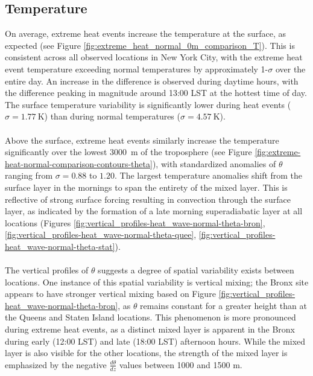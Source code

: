 \documentclass[11pt,a4paper]{article}
\begin{document}
\subsection{Temperature}
On average, extreme heat events increase the temperature at the surface, as expected (see Figure \ref{fig:extreme_heat_normal_0m_comparison_T}). This is consistent across all observed locations in New York City, with the extreme heat event temperature exceeding normal temperatures by approximately 1-$\sigma$ over the entire day. An increase in the difference is observed during daytime hours, with the difference peaking in magnitude around 13:00 LST at the hottest time of day. The surface temperature variability is significantly lower during heat events ($ \sigma = \SI{1.77}{\kelvin} $) than during normal temperatures ($ \sigma = \SI{4.57}{\kelvin} $).
\\ \\
Above the surface, extreme heat events similarly increase the temperature significantly over the lowest \SI{3000}{\meter} of the troposphere (see Figure \ref{fig:extreme-heat-normal-comparison-contours-theta}), with standardized anomalies of $\theta$ ranging from $\sigma = 0.88$ to $1.20$. The largest temperature anomalies shift from the surface layer in the mornings to span the entirety of the mixed layer. This is reflective of strong surface forcing resulting in convection through the surface layer, as indicated by the formation of a late morning superadiabatic layer at all locations (Figures \ref{fig:vertical_profiles-heat_wave-normal-theta-bron}, \ref{fig:vertical_profiles-heat_wave-normal-theta-quee}, \ref{fig:vertical_profiles-heat_wave-normal-theta-stat}). 
\\ \\
The vertical profiles of $\theta$ suggests a degree of spatial variability exists between locations. One instance of this spatial variability is vertical mixing; the Bronx site appears to have stronger vertical mixing based on Figure \ref{fig:vertical_profiles-heat_wave-normal-theta-bron}, as $\theta$ remains constant for a greater height than at the Queens and Staten Island locations. This phenomenon is more pronounced during extreme heat events, as a distinct mixed layer is apparent in the Bronx during early (12:00 LST) and late (18:00 LST) afternoon hours. While the mixed layer is also visible for the other locations, the strength of the mixed layer is emphasized by the negative $\frac{d\theta}{dz}$ values between 1000 and 1500 m.
\end{document}

